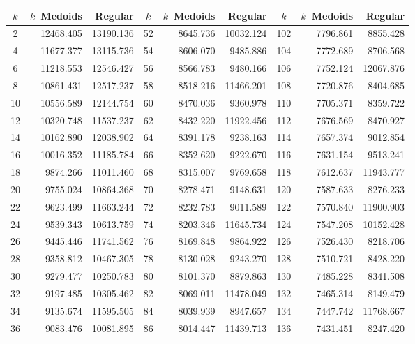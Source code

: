 \begin{table}[h]
	\centering
	\tiny
	\begin{tabular}{|c|r|r|c|r|r|c|r|r|}
		\hline
		$k$  & $k$--Medoids & Regular & $k$ & $k$--Medoids & Regular & $k$ & $k$--Medoids & Regular \\ \hline
		2  & 12468.405 & 13190.136 &  52 & 8645.736 & 10032.124 & 102 & 7796.861 &  8855.428 \\
		4  & 11677.377 & 13115.736 &  54 & 8606.070 &  9485.886 & 104 & 7772.689 &  8706.568 \\
		6  & 11218.553 & 12546.427 &  56 & 8566.783 &  9480.166 & 106 & 7752.124 & 12067.876 \\
		8  & 10861.431 & 12517.237 &  58 & 8518.216 & 11466.201 & 108 & 7720.876 &  8404.685 \\
		10 & 10556.589 & 12144.754 &  60 & 8470.036 &  9360.978 & 110 & 7705.371 &  8359.722 \\
		12 & 10320.748 & 11537.237 &  62 & 8432.220 & 11922.456 & 112 & 7676.569 &  8470.927 \\
		14 & 10162.890 & 12038.902 &  64 & 8391.178 &  9238.163 & 114 & 7657.374 &  9012.854 \\
		16 & 10016.352 & 11185.784 &  66 & 8352.620 &  9222.670 & 116 & 7631.154 &  9513.241 \\
		18 &  9874.266 & 11011.460 &  68 & 8315.007 &  9769.658 & 118 & 7612.637 & 11943.777 \\
		20 &  9755.024 & 10864.368 &  70 & 8278.471 &  9148.631 & 120 & 7587.633 &  8276.233 \\
		22 &  9623.499 & 11663.244 &  72 & 8232.783 &  9011.589 & 122 & 7570.840 & 11900.903 \\
		24 &  9539.343 & 10613.759 &  74 & 8203.346 & 11645.734 & 124 & 7547.208 & 10152.428 \\
		26 &  9445.446 & 11741.562 &  76 & 8169.848 &  9864.922 & 126 & 7526.430 &  8218.706 \\
		28 &  9358.812 & 10467.305 &  78 & 8130.028 &  9243.270 & 128 & 7510.721 &  8428.220 \\
		30 &  9279.477 & 10250.783 &  80 & 8101.370 &  8879.863 & 130 & 7485.228 &  8341.508 \\
		32 &  9197.485 & 10305.462 &  82 & 8069.011 & 11478.049 & 132 & 7465.314 &  8149.479 \\
		34 &  9135.674 & 11595.505 &  84 & 8039.939 &  8947.657 & 134 & 7447.742 & 11768.667 \\
		36 &  9083.476 & 10081.895 &  86 & 8014.447 & 11439.713 & 136 & 7431.451 &  8247.420 \\

\end{tabular}
\end{table}
